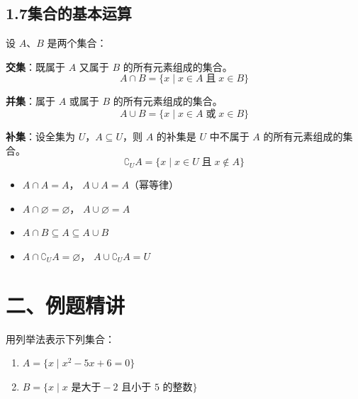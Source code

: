 \documentclass[12pt, a4paper]{ctexart}
\begin{document}
\subsection*{1.7\quad 集合的基本运算}

\begin{knowledgebox}[交集、并集、补集]
设 $A$、$B$ 是两个集合：

\textbf{交集}：既属于 $A$ 又属于 $B$ 的所有元素组成的集合。
\[
A \cap B = \{x \mid x \in A \;\text{且}\; x \in B\}
\]

\textbf{并集}：属于 $A$ 或属于 $B$ 的所有元素组成的集合。
\[
A \cup B = \{x \mid x \in A \;\text{或}\; x \in B\}
\]

\textbf{补集}：设全集为 $U$，$A \subseteq U$，则 $A$ 的补集是 $U$ 中不属于 $A$ 的所有元素组成的集合。
\[
\complement_U A = \{x \mid x \in U \;\text{且}\; x \notin A\}
\]
\end{knowledgebox}

\begin{tipbox}[运算性质速记]
\begin{itemize}[leftmargin=2em]
  \item $A \cap A = A$，\; $A \cup A = A$（幂等律）
  \item $A \cap \varnothing = \varnothing$，\; $A \cup \varnothing = A$
  \item $A \cap B \subseteq A \subseteq A \cup B$
  \item $A \cap \complement_U A = \varnothing$，\; $A \cup \complement_U A = U$
\end{itemize}
\end{tipbox}


\section*{\textcolor{examorange}{二、例题精讲}}

\begin{examplebox}[【例题1】集合的表示]
用列举法表示下列集合：
\begin{enumerate}[label=(\arabic*), leftmargin=2em]
  \item $A = \{x \mid x^2 - 5x + 6 = 0\}$
  \item $B = \{x \mid x \text{ 是大于} -2 \text{ 且小于 } 5 \text{ 的整数}\}$
\end{enumerate}
\end{examplebox}
\end{document}

